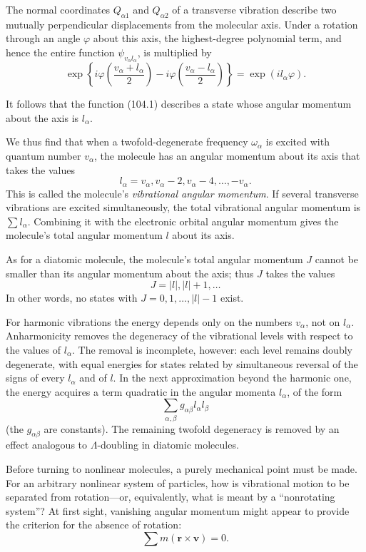 The normal coordinates $Q_{\alpha1}$ and $Q_{\alpha2}$ of a transverse vibration describe two mutually perpendicular displacements from the molecular axis. Under a rotation through an angle $\varphi$ about this axis, the highest-degree polynomial term, and hence the entire function $\psi_{v_\alpha l_\alpha}$, is multiplied by
\[
 \exp\left\{i\varphi\left(\frac{v_\alpha+l_\alpha}{2}\right)
 -i\varphi\left(\frac{v_\alpha-l_\alpha}{2}\right)\right\}
 =\exp(il_\alpha\varphi).
\]

It follows that the function (104.1) describes a state whose angular momentum about the axis is $l_\alpha$.

We thus find that when a twofold-degenerate frequency $\omega_\alpha$ is excited with quantum number $v_\alpha$, the molecule has an angular momentum about its axis that takes the values
\begin{equation}
 l_\alpha=v_\alpha,v_\alpha-2,v_\alpha-4,\ldots,-v_\alpha.
 \tag{104.2}
\end{equation}
This is called the molecule's \emph{vibrational angular momentum}. If several transverse vibrations are excited simultaneously, the total vibrational angular momentum is $\sum l_\alpha$. Combining it with the electronic orbital angular momentum gives the molecule's total angular momentum $l$ about its axis.

As for a diatomic molecule, the molecule's total angular momentum $J$ cannot be smaller than its angular momentum about the axis; thus $J$ takes the values
\[
 J=|l|,|l|+1,\ldots
\]
In other words, no states with $J=0,1,\ldots,|l|-1$ exist.

For harmonic vibrations the energy depends only on the numbers $v_\alpha$, not on $l_\alpha$. Anharmonicity removes the degeneracy of the vibrational levels with respect to the values of $l_\alpha$. The removal is incomplete, however: each level remains doubly degenerate, with equal energies for states related by simultaneous reversal of the signs of every $l_\alpha$ and of $l$. In the next approximation beyond the harmonic one, the energy acquires a term quadratic in the angular momenta $l_\alpha$, of the form
\[
 \sum_{\alpha,\beta}g_{\alpha\beta}l_\alpha l_\beta
\]
(the $g_{\alpha\beta}$ are constants). The remaining twofold degeneracy is removed by an effect analogous to $\Lambda$-doubling in diatomic molecules.

Before turning to nonlinear molecules, a purely mechanical point must be made. For an arbitrary nonlinear system of particles, how is vibrational motion to be separated from rotation---or, equivalently, what is meant by a ``nonrotating system''? At first sight, vanishing angular momentum might appear to provide the criterion for the absence of rotation:
\begin{equation}
 \sum m(\mathbf r\times\mathbf v)=0.
 \tag{104.3}
\end{equation}

